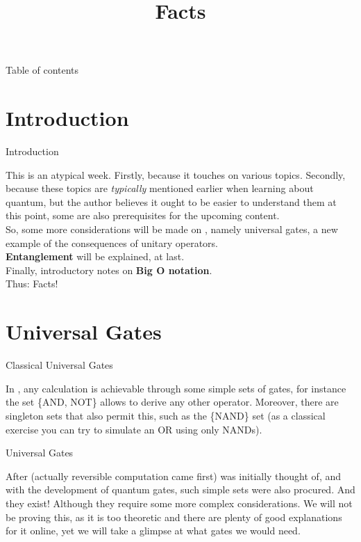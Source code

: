 \documentclass[aspectratio=43]{beamer}
\title{\q Facts}
\begin{document}
\begin{frame}
	\titlepage
\end{frame}


\begin{frame}{Table of contents}
	\begin{card}
		\tableofcontents
	\end{card}
\end{frame}


\section{Introduction}
\begin{frame}{Introduction}
    \begin{card}
    This is an atypical week. Firstly, because it touches on various topics. Secondly, because these topics are \textit{typically} mentioned earlier when learning about quantum, but the author believes it ought to be easier to understand them at this point, some are also prerequisites for the upcoming content.\\
    So, some more considerations will be made on \textbf{\qcts}, namely universal gates, a new example of the consequences of unitary operators.\\ \textbf{Entanglement} will be explained, at last.\\ Finally, introductory notes on \textbf{Big O notation}.\\
    Thus: \q Facts!
    \end{card}
\pagenumber
\end{frame}

\section{Universal Gates}
\begin{frame}{Classical Universal Gates}
\begin{card}
    In \cc, any calculation is achievable through some simple sets of gates, for instance the set \{AND, NOT\} allows to derive any other operator. Moreover, there are singleton sets that also permit this, such as the \{NAND\} set (as a classical exercise you can try to simulate an OR using only NANDs).
\end{card}
\pagenumber
\end{frame}

\begin{frame}{\q Universal Gates}
\begin{card}
    After \qc (actually reversible computation came first) was initially thought of, and with the development of quantum gates, such simple sets were also procured. And they exist! Although they require some more complex considerations. We will not be proving this, as it is too theoretic and there are plenty of good explanations for it online, yet we will take a glimpse at what gates we would need.
\end{card}
\pagenumber
\end{frame}
\end{document}
